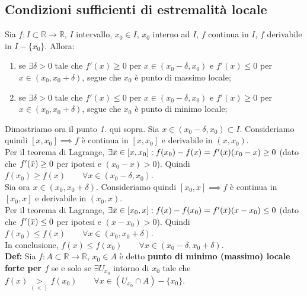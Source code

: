 \documentclass{article}
\begin{document}
\subsection{Condizioni sufficienti di estremalità locale}
Sia $f: I \subset \mathbb{R} \xrightarrow{} \mathbb{R}$, $I$ intervallo, $x_0 \in I$, $x_0$ interno ad $I$, $f$ continua in $I$, $f$ derivabile in $I - \{x_0\}$. Allora:
\begin{enumerate}
    \item se $\exists \delta > 0$ tale che $f'(x) \geq 0$ per $x \in (x_0 - \delta, x_0)$ e $f'(x) \leq 0$ per $x \in (x_0, x_0 + \delta)$, segue che $x_0$ è punto di massimo locale;
    \item se $\exists \delta > 0$ tale che $f'(x) \leq 0$ per $x \in (x_0 - \delta, x_0)$ e $f'(x) \geq 0$ per $x \in (x_0, x_0 + \delta)$, segue che $x_0$ è punto di minimo locale;
\end{enumerate}

\noindent Dimostriamo ora il punto \textit{1.} qui sopra. Sia $x \in (x_0 - \delta, x_0) \subset I$. Consideriamo quindi $[x, x_0] \implies f$ è continua in $[x, x_0]$ e derivabile in $(x, x_0)$.\\
Per il teorema di Lagrange, $\exists \Bar{x} \in [x, x_0] : f(x_0) - f(x) = f'(\Bar{x})(x_0 - x) \geq 0$ (dato che $f'(\Bar{x}) \geq 0$ per ipotesi e $(x_0 - x) > 0$). Quindi $f(x_0) \geq f(x) \qquad \forall x \in (x_0 - \delta, x_0)$.\\
Sia ora $x \in (x_0, x_0 + \delta)$. Consideriamo quindi $[x_0, x] \implies f$ è continua in $[x_0, x]$ e derivabile in $(x_0, x)$. \\
Per il teorema di Lagrange, $\exists \Bar{x} \in [x_0, x] : f(x) - f(x_0) = f'(\Bar{x})(x - x_0) \leq 0$ (dato che $f'(\Bar{x}) \leq 0$ per ipotesi e $(x - x_0) > 0$). Quindi $f(x_0) \leq f(x) \qquad \forall x \in (x_0, x_0 + \delta)$.\\
In conclusione, $f(x) \leq f(x_0) \qquad \forall x \in (x_0 - \delta, x_0 + \delta)$.\\

\noindent\textbf{Def:} Sia $f: A \subset \mathbb{R} \xrightarrow{} \mathbb{R}$, $x_0 \in A$ è detto \textbf{punto di minimo (massimo) locale forte per $f$} se e solo se $\exists U_{x_0}$ intorno di $x_0$ tale che $f(x) \underset{(<)}{>} f(x_0) \qquad \forall x \in (U_{x_0} \cap A) - \{x_0\}$.
\end{document}
